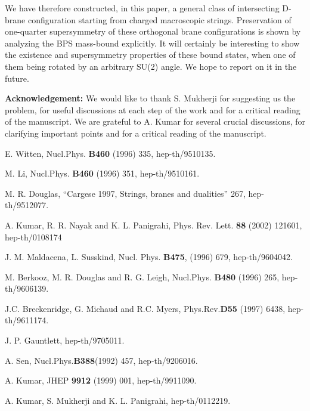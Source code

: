 \documentclass[a4paper,12pt,fleqn,cite,epsfig]{article}
\begin{document}
We have therefore constructed, in this paper, a general class 
of intersecting D- brane configuration starting from charged 
macroscopic strings. Preservation of one-quarter supersymmetry 
of these orthogonal brane
configurations is shown by analyzing the BPS mass-bound explicitly.
It will certainly be interesting to show the existence and
supersymmetry properties of these bound states, when one of 
them being rotated by an arbitrary SU(2) angle. 
We hope to report on it in the future.

{\bf Acknowledgement:} We would like to thank S. Mukherji for
suggesting us the problem, for useful discussions at each step of
the work and for a critical reading of the manuscript. We are grateful
to A. Kumar for several crucial discussions, for clarifying important
points and for a critical reading of the manuscript.
\begin{thebibliography}{99}
 E. Witten,  Nucl.Phys. {\bf B460} (1996) 335,   
 hep-th/9510135. 

 M. Li, Nucl.Phys. {\bf B460} (1996) 351, hep-th/9510161.

 M. R. Douglas, ``Cargese 1997, Strings, 
branes and dualities'' 267, hep-th/9512077.

 A. Kumar, R. R. Nayak and K. L. Panigrahi,
Phys. Rev. Lett. {\bf 88} (2002) 121601, hep-th/0108174

 J. M. Maldacena, L. Susskind, Nucl. Phys. {\bf
 B475}, (1996) 679, hep-th/9604042.
      
 M. Berkooz, M. R. Douglas and R. G. Leigh,
Nucl.Phys. {\bf B480} (1996) 265, hep-th/9606139.
 
 J.C. Breckenridge, G. Michaud and R.C. Myers,
 Phys.Rev.{\bf D55} (1997) 6438, hep-th/9611174.

 J. P. Gauntlett, hep-th/9705011.

 A. Sen, Nucl.Phys.{\bf B388}(1992) 457, hep-th/9206016.

 A. Kumar, JHEP {\bf 9912} (1999) 001,
  hep-th/9911090. 

 A. Kumar, S. Mukherji and K. L. Panigrahi,  
hep-th/0112219.


\end{thebibliography}
\end{document}
